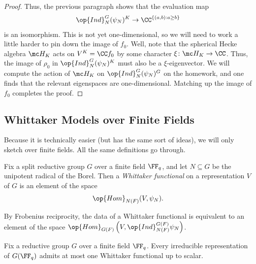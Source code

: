 \documentclass[../notes.tex]{subfiles}
\begin{document}
\begin{proof}
	Thus, the previous paragraph shows that the evaluation map
	\[\op{Ind}_N^G(\psi_N)^K\to\CC^{\{(a,b):a\ge b\}}\]
	is an isomorphism. This is not yet one-dimensional, so we will need to work a little harder to pin down the image of $f_0$. Well, note that the spherical Hecke algebra $\mc H_K$ acts on $V^K=\CC f_0$ by some character $\xi\colon\mc H_K\to\CC$. Thus, the image of $\rho_0$ in $\op{Ind}_N^G(\psi_N)^K$ must also be a $\xi$-eigenvector. We will compute the action of $\mc H_K$ on $\op{Ind}_N^G(\psi_N)^G$ on the homework, and one finds that the relevant eigenspaces are one-dimensional. Matching up the image of $f_0$ completes the proof.
\end{proof}

\subsection{Whittaker Models over Finite Fields}
Because it is technically easier (but has the same sort of ideas), we will only sketch  over finite fields. All the same definitions go through.
\begin{definition}
	Fix a split reductive group $G$ over a finite field $\FF_q$, and let $N\subseteq G$ be the unipotent radical of the Borel. Then a \textit{Whittaker functional} on a representation $V$ of $G$ is an element of the space
	\[\op{Hom}_{N(F)}(V,\psi_N).\]
\end{definition}
\begin{remark} \label{rem:whittaker-by-embed}
	By Frobenius reciprocity, the data of a Whittaker functional is equivalent to an element of the space $\op{Hom}_{G(F)}\left(V,\op{Ind}_{N(F)}^{G(F)}\psi_N\right)$.
\end{remark}
\begin{theorem} \label{thm:gelfand-graev}
	Fix a reductive group $G$ over a finite field $\FF_q$. Every irreducible representation of $G(\FF_q)$ admits at most one Whittaker functional up to scalar.
\end{theorem}
\end{document}
